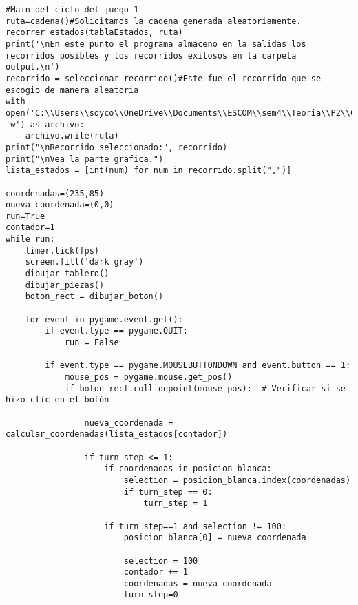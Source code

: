 \begin{enumerate}
\begin{lstlisting}
#Main del ciclo del juego 1
ruta=cadena()#Solicitamos la cadena generada aleatoriamente.
recorrer_estados(tablaEstados, ruta)
print('\nEn este punto el programa almaceno en la salidas los recorridos posibles y los recorridos exitosos en la carpeta output.\n')
recorrido = seleccionar_recorrido()#Este fue el recorrido que se escogio de manera aleatoria
with open('C:\\Users\\soyco\\OneDrive\\Documents\\ESCOM\\sem4\\Teoria\\P2\\Chess\\output\\ruta_blanca.txt', 'w') as archivo:
    archivo.write(ruta)
print("\nRecorrido seleccionado:", recorrido)
print("\nVea la parte grafica.")
lista_estados = [int(num) for num in recorrido.split(",")]

coordenadas=(235,85)
nueva_coordenada=(0,0)
run=True
contador=1
while run:
    timer.tick(fps)
    screen.fill('dark gray')
    dibujar_tablero()
    dibujar_piezas()
    boton_rect = dibujar_boton()

    for event in pygame.event.get():
        if event.type == pygame.QUIT:
            run = False

        if event.type == pygame.MOUSEBUTTONDOWN and event.button == 1:
            mouse_pos = pygame.mouse.get_pos()
            if boton_rect.collidepoint(mouse_pos):  # Verificar si se hizo clic en el botón
                
                nueva_coordenada = calcular_coordenadas(lista_estados[contador])
                
                if turn_step <= 1:
                    if coordenadas in posicion_blanca:
                        selection = posicion_blanca.index(coordenadas)
                        if turn_step == 0:
                            turn_step = 1
                        
                    if turn_step==1 and selection != 100:
                        posicion_blanca[0] = nueva_coordenada
                        
                        selection = 100
                        contador += 1
                        coordenadas = nueva_coordenada
                        turn_step=0


\end{lstlisting}
\end{enumerate}
